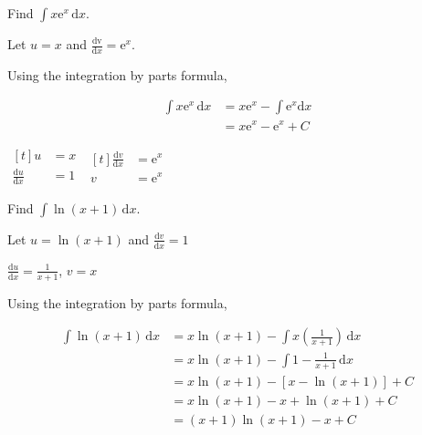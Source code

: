 \documentclass[11pt,a4paper]{book}
\begin{document}
\begin{example}

Find ${\displaystyle \int x\mathrm{e}^{x}\,\mathrm{d}x}$.

\medskip

\Solution

Let $u=x$ and ${\displaystyle \frac{\mathrm{dv}}{\mathrm{d}x}=\mathrm{e}^{x}}$.

\begin{minipage}[t]{0.6\textwidth}


Using the integration by parts formula,

\begin{align*}
\int x\mathrm{e}^{x}\,\mathrm{d}x & =x\mathrm{e}^{x}-\int\mathrm{e}^{x}\mathrm{d}x\\
 & =x\mathrm{e}^{x}-\mathrm{e}^{x}+C
\end{align*}

\end{minipage}
\begin{minipage}[t]{0.4\textwidth}

$
\begin{aligned}[t]
u & =x\\
\frac{\mathrm{d}u}{\mathrm{d}x} & =1
\end{aligned}
$
\hspace{1cm}
$
\begin{aligned}[t]
\frac{\mathrm{d}v}{\mathrm{d}x} & =\mathrm{e}^{x}\\
v & =\mathrm{e}^{x}
\end{aligned}
$

\end{minipage}
\end{example}

\newpage

\begin{example}

Find ${\displaystyle \int\ln(x+1)\, \mathrm{d}x}$.

\medskip

\Solution
Let $u=\ln(x+1)$ and ${\displaystyle \frac{\mathrm{d}v}{\mathrm{d}x}=1}$

\hspace{0.26cm} ${\displaystyle \frac{\mathrm{d}u}{\mathrm{d}x}=\frac{1}{x+1}}$, \hspace{1.25cm}
${\displaystyle v=x}$

\medskip

Using the integration by parts formula,

\medskip

\begin{align*}
{\displaystyle \int\ln(x+1)\, \mathrm{d}x} & =x\ln(x+1)-\int x\left(\frac{1}{x+1}\right)\, \mathrm{d}x\\
 & =x\ln(x+1)-\int1-\frac{1}{x+1}\, \mathrm{d}x\\
 & =x\ln(x+1)-\left[x-\ln\left(x+1\right)\right]+C\\
 & =x\ln(x+1)-x+\ln\left(x+1\right)+C\\
 & =(x+1)\ln\left(x+1\right)-x+C
\end{align*}
\end{example}
\end{document}
